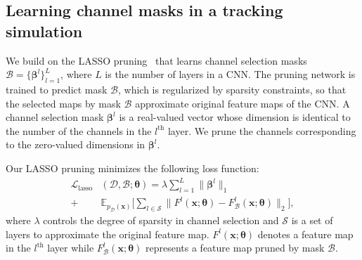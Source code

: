 \documentclass[letterpaper]{article} %
\def \x{\mathbf{x}}
\def \thetageneral{\boldsymbol{\theta}}
\def \losslasso{\mathcal{L}_\text{lasso}}
\begin{document}
\subsection{Learning channel masks in a tracking simulation}
We build on the LASSO pruning~\cite{he2017channel} that learns channel selection masks $\mathcal{B}=\{\boldsymbol{\beta}^l\}_{l=1}^{L}$, where $L$ is the number of layers in a CNN.
The pruning network is trained to predict mask $\mathcal{B}$, which is regularized by sparsity constraints, so that the selected maps by mask $\mathcal{B}$ approximate original feature maps of the CNN.  
A channel selection mask $\boldsymbol{\beta}^l$ is a real-valued vector whose dimension is identical to the number of the channels in the $l^\text{th}$ layer.
We prune the channels corresponding to the zero-valued dimensions in $\boldsymbol{\beta}^l$.

Our LASSO pruning minimizes the following loss function:
%
\begin{equation}
\begin{split}
\textstyle \losslasso&(\mathcal{D}, \mathcal{B} ; \thetageneral)
	= \textstyle  \lambda \sum_{l=1}^L\big\| \boldsymbol{\beta}^l\big\|_1
	\\
	+ & \textstyle \mathbb{E}_{p_{\mathcal{D}}(\x)} \Big[
		\sum_{l\in\mathcal{S}} 
			\big\|F^l(\x; \boldsymbol{\theta}) -  F^l_\mathcal{B}(\x; \boldsymbol{\theta})\big\|_2  \Big]  ,
\label{eq:lasso_prune}
\end{split}
\end{equation}
%
where $\lambda$ controls the degree of sparsity in channel selection and $\mathcal{S}$ is a set of layers to approximate the original feature map.
$F^l(\x ; \boldsymbol{\theta})$ denotes a feature map in the $l^\text{th}$ layer while $F^l_ \mathcal{B}(\x; \boldsymbol{\theta})$ represents a feature map pruned by mask $\mathcal{B}$. 
\end{document}
